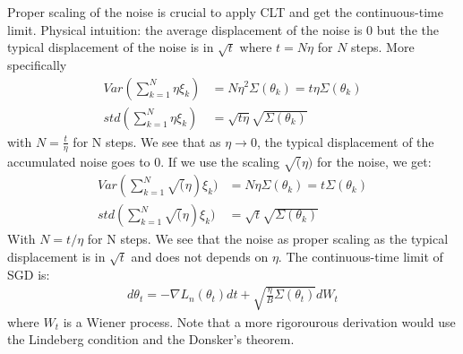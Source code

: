 \documentclass[11pt]{article}
\begin{document}
Proper scaling of the noise is crucial to apply CLT and get the continuous-time limit.
Physical intuition: the average displacement of the noise is 0 but the the typical displacement of the noise is in $\sqrt{t}$ where $t = N\eta$ for $N$ steps.
More specifically
\begin{align}
Var(\sum_{k=1}^N \eta \xi_k) & = N\eta^2\Sigma(\theta_k) = t\eta\Sigma(\theta_k)\\
std( \sum_{k=1}^N \eta \xi_k) & = \sqrt{t\eta}\sqrt{\Sigma(\theta_k)}
\end{align}
with $N = \frac{t}{\eta}$ for N steps. We see that as $\eta \to 0$, the typical displacement of the accumulated noise goes to 0.
If we use the scaling $\sqrt(\eta)$ for the noise, we get:
\begin{align}
Var(\sum_{k=1}^N \sqrt(\eta) \xi_k) & = N\eta\Sigma(\theta_k) = t\Sigma(\theta_k)\\
std( \sum_{k=1}^N \sqrt(\eta) \xi_k) & = \sqrt{t}\sqrt{\Sigma(\theta_k)}
\end{align}
With $N= t/\eta$ for N steps. We see that the noise as proper scaling as the typical displacement is in $\sqrt{t}$ and does not depends on $\eta$.
The continuous-time limit of SGD is:
\begin{align}
d\theta_t = - \nabla L_n(\theta_t) dt + \sqrt{\frac{\eta}{B}\Sigma(\theta_t)} dW_t
\end{align}
where $W_t$ is a Wiener process. Note that a more rigorourous derivation would use the Lindeberg condition and the Donsker's theorem.
\end{document}
